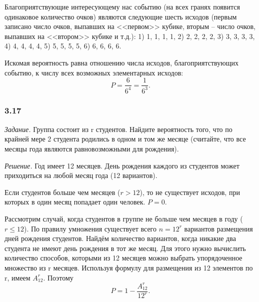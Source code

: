 \documentclass{book}
\begin{document}
Благоприятствующие интересующему нас событию (на всех гранях появится одинаковое количество очков) являются следующие шесть исходов (первым записано число очков, выпавших на <<первом>> кубике, вторым -- число очков, выпавших на <<втором>> кубике и т.д.): 1) 1, 1, 1, 1, 2) 2, 2, 2, 2, 3) 3, 3, 3, 3, 4) 4, 4, 4, 4, 5) 5, 5, 5, 5, 6) 6, 6, 6, 6.

Искомая вероятность равна отношению числа исходов, благоприятствующих событию, к числу всех возможных элементарных исходов: $$P=\frac{6}{6^4}=\frac{1}{6^3}.$$

\subsubsection*{3.17}

\textit{Задание.} Группа состоит из r студентов. Найдите вероятность того, что по крайней мере 2 студента родились в одном и том же месяце (считайте, что все месяцы года являются равновозможными для рождения).

\textit{Решение.} Год имеет 12 месяцев. День рождения каждого из студентов может приходиться на любой месяц года (12 вариантов).

Если студентов больше чем месяцев ($r>12$), то не существует исходов, при которых в один месяц попадает один человек. $P=0$.

Рассмотрим случай, когда студентов в группе не больше чем месяцев в году ($r\leq 12$). По правилу умножения существует всего $n=12^r$ вариантов размещения дней рождения студентов. Найдём количество вариантов, когда никакие два студента не имеют день рождения в тот же месяц. Для этого нужно вычислить количество способов, которыми из 12 месяцев можно выбрать упорядоченное множество из r месяцев. Используя формулу для размещения из 12 элементов по r, имеем $A_{12}^r$. Поэтому $$P=1-\frac{A_{12}^r}{12^r}.$$
\end{document}
